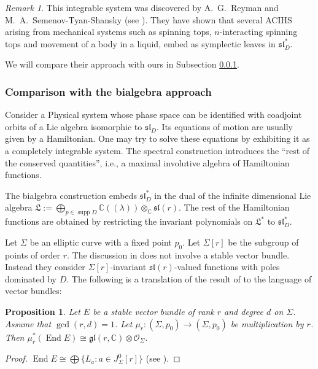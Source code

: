 \documentclass[12pt,a4paper,oneside,english]{smfart}
\newtheorem{prop}[thm]{Proposition}
\theoremstyle{definition}
\theoremstyle{remark}
\newtheorem{rem}[thm]{Remark}
\DeclareMathOperator{\End}{End}
\DeclareMathOperator{\supp}{supp}
\newcommand{\cO}{\mathcal{O}}
\begin{document}
\begin{rem}\label{t9.3}
This integrable system was discovered by A.~G.~Reyman and M.~A.~Semenov-Tyan-Shansky (see \cite{R-S}). They have shown that several ACIHS arising from mechanical systems such as spinning tops, $n$-interacting spinning tops and movement of a body in a liquid, embed as symplectic leaves in $\mathfrak{sl}_D^*$.
\end{rem}

We will compare their approach with ours in Subsection \ref{sec:9.2.2}.

\subsubsection{Comparison with the bialgebra approach}\label{sec:9.2.2}

Consider a Physical system whose phase space can be identified with coadjoint orbits of a Lie algebra isomorphic to $\mathfrak{sl}_D$. Its equations of motion are usually given by a Hamiltonian. One may try to solve these equations by exhibiting it as a completely integrable system. The spectral construction introduces the ``rest of the conserved quantities'', i.e., a maximal involutive algebra of Hamiltonian functions.

The bialgebra construction embeds $\mathfrak{sl}_D^*$ in the dual of the infinite dimensional Lie algebra $\mathfrak{L} := \bigoplus_{p \in \supp D} \mathbb{C}((\lambda)) \otimes_{\mathbb{C}} \mathfrak{sl}(r)$. The rest of the Hamiltonian functions are obtained by restricting the invariant polynomials on $\mathfrak{L}^*$ to $\mathfrak{sl}_D^*$.

Let $\Sigma$ be an elliptic curve with a fixed point $p_0$. Let $\Sigma[r]$ be the subgroup of points of order $r$. The discussion in \cite{R-S} does not involve a stable vector bundle. Instead they consider $\Sigma[r]$-invariant $\mathfrak{sl}(r)$-valued functions with poles dominated by $D$. The following is a translation of the result of \cite{R-S} to the language of vector bundles:

\begin{prop}\label{t9.4}
Let $E$ be a stable vector bundle of rank $r$ and degree $d$ on $\Sigma$. Assume that $\gcd(r, d) = 1$. Let $\mu_r \colon (\Sigma, p_0) \to (\Sigma, p_0)$ be multiplication by $r$. Then $\mu_r^*(\End E) \cong \mathfrak{gl}(r, \mathbb{C}) \otimes \cO_\Sigma$.
\end{prop}

\begin{proof}
$\End E \cong \bigoplus \{L_a \colon a \in J_\Sigma^0[r]\}$ (see \cite{At}).
\end{proof}
\end{document}
